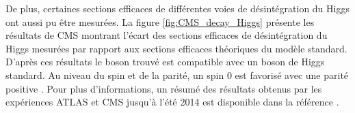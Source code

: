 %   

  \medskip

  De plus, certaines sections efficaces de diff\'erentes voies de d\'esint\'egration du Higgs ont aussi pu \^etre mesur\'ees. La figure \ref{fig:CMS_decay_Higgs} pr\'esente les r\'esultats de CMS montrant l'\'ecart des sections efficaces de d\'esint\'egration du Higgs mesur\'ees par rapport aux sections efficaces th\'eoriques du mod\`ele standard. D'apr\`es ces r\'esultats le boson trouv\'e est compatible avec un boson de Higgs standard. Au niveau du spin et de la parit\'e, un spin $0$ est favoris\'e avec une parit\'e positive \cite{Aad:2013xqa}. Pour plus d'informations, un r\'esum\'e des r\'esultats obtenus par les exp\'eriences ATLAS et CMS jusqu'à l'\'et\'e 2014 est disponible dans la r\'ef\'erence \cite{Wang:2014xsa}.
  
